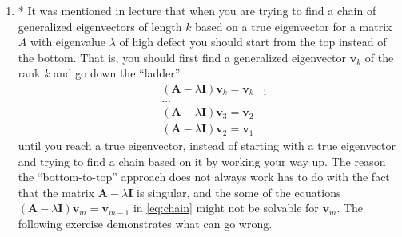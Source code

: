 \documentclass[11pt]{article}
\newcommand{\bA}{\mathbf{A}}
\newcommand{\bv}{\mathbf{v}}
\newcommand{\bI}{\mathbf{I}}
\newcommand{\calL}{\mathcal{L}}
\renewcommand{\l}{\lambda}
\begin{document}
\begin{enumerate}


























\item * It was mentioned in lecture that when you are trying to find a chain of generalized eigenvectors of length $k$ based on a true eigenvector for a matrix $A$ with eigenvalue $\l$ of high defect you should start from the top instead of the bottom.
That is, you should first find a generalized eigenvector $\bv_k$ of the rank $k$ and go down the ``ladder''
\begin{equation}
        \label{eq:chain}
    \begin{aligned}
        &(\bA-\l \bI)\bv_{k}=\bv_{k-1}\\
        &\dots\\
        &(\bA-\l \bI)\bv_{3}=\bv_{2}\\
        &(\bA-\l \bI)\bv_{2}=\bv_{1}
    \end{aligned}
\end{equation} until you reach a true eigenvector, instead of starting with a true eigenvector and trying to find a chain based on it by working your way up.
The reason the ``bottom-to-top'' approach does not always work has to do with the fact that the matrix $\bA-\l\bI$ is singular, and the some of the equations $(\bA-\l \bI)\bv_{m}=\bv_{m-1}$ in \eqref{eq:chain} might not be solvable for $\bv_m$.
The following exercise demonstrates what can go wrong.


\end{enumerate}
\end{document}
